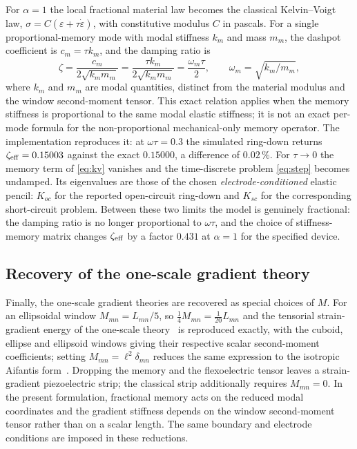 For $\alpha=1$ the local fractional material law becomes the classical
Kelvin--Voigt law, $\sigma=C(\varepsilon+\tau\dot\varepsilon)$,
with constitutive modulus $C$ in pascals. For a single proportional-memory
mode with modal stiffness $k_m$ and mass $m_m$, the dashpot coefficient
is $c_m=\tau k_m$, and the damping ratio is
\begin{equation}
  \zeta = \frac{c_m}{2\sqrt{k_m m_m}}
         =\frac{\tau k_m}{2\sqrt{k_m m_m}}
         =\frac{\omega_m\tau}{2},\qquad
  \omega_m=\sqrt{k_m/m_m},
  \label{eq:limitKV}
\end{equation}
where $k_m$ and $m_m$ are modal quantities, distinct from the material
modulus and the window second-moment tensor. This exact relation applies
when the memory stiffness is proportional to the same modal elastic
stiffness; it is not an exact per-mode formula for the non-proportional
mechanical-only memory operator.
The implementation reproduces it: at $\omega\tau=0.3$ the simulated
ring-down returns $\zeta_{\rm eff}=0.15003$ against the exact
$0.15000$, a difference of $0.02\,\%$. For $\tau\to0$ the memory term of
\eqref{eq:kv} vanishes and the time-discrete problem \eqref{eq:step}
becomes undamped. Its eigenvalues are those of the chosen
\emph{electrode-conditioned} elastic pencil: $K_{oc}$ for the reported
open-circuit ring-down and $K_{sc}$ for the corresponding short-circuit
problem. Between these two limits the model is genuinely fractional: the
damping ratio is no longer proportional to $\omega\tau$, and the choice of stiffness-memory matrix changes $\zeta_{\rm eff}$ by a factor $0.431$
at $\alpha=1$ for the specified device.

\FloatBarrier
\subsection{Recovery of the one-scale gradient theory}
\label{sec:limit_fem1}

Finally, the one-scale gradient theories are recovered as special choices of
$M$. For an ellipsoidal window $M_{mn}=L_{mn}/5$, so
$\tfrac14M_{mn}=\tfrac1{20}L_{mn}$ and the tensorial strain-gradient energy of
the one-scale theory~\cite{fem1} is reproduced exactly, with the cuboid,
ellipse and ellipsoid windows giving their respective scalar second-moment
coefficients; setting $M_{mn}=\ell^{2}\delta_{mn}$ reduces
the same expression to the isotropic Aifantis form~\cite{Aifantis1992}.
Dropping the memory and the flexoelectric tensor leaves a strain-gradient
piezoelectric strip; the classical strip additionally requires $M_{mn}=0$.
In the present formulation, fractional memory acts on the reduced modal
coordinates and the gradient stiffness depends on the window second-moment
tensor rather than on a scalar length. The same boundary and electrode conditions are imposed in these reductions.

\FloatBarrier
